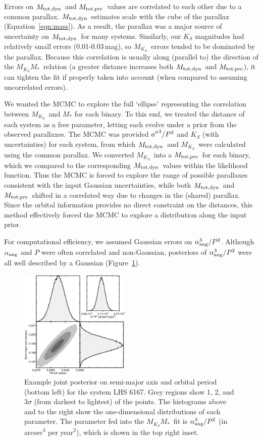 \documentclass[twocolumn]{aastex62}
\newcommand{\mks}{$M_{K_S}$}
\newcommand{\mmk}{$M_{K_S}$\textendash$M_*$}
\newcommand{\mpred}{$M_{\rm{tot,pre}}$}
\newcommand{\mdyn}{$M_{\rm{tot,dyn}}$}
\begin{document}
Errors on \mdyn\ and \mpred\ values are correlated to each other due to a common parallax. \mdyn\ estimates scale with the cube of the parallax (Equation~\ref{eqn:mass}). As a result, the parallax was a major source of uncertainty on \mdyn\ for many systems. Similarly, our $K_S$ magnitudes had relatively small errors (0.01-0.03\,mag), so \mks\ errors tended to be dominated by the parallax. Because this correlation is usually along (parallel to) the direction of the \mmk\ relation (a greater distance increases both \mdyn\ and \mpred), it can tighten the fit if properly taken into account (when compared to assuming uncorrelated errors). 
 
We wanted the MCMC to explore the full `ellipse' representing the correlation between \mks\ and $M_*$ for each binary. To this end, we treated the distance of each system as a free parameter, letting each evolve under a prior from the observed parallaxes. The MCMC was provided $a\mbox{$^{\prime\prime}$}^3/P^2$ and $K_S$ (with uncertainties) for each system, from which \mdyn\ and \mks\ were calculated using the common parallax. We converted \mks\ into a \mpred\ for each binary, which we compared to the corresponding \mdyn\ values within the likelihood function. Thus the MCMC is forced to explore the range of possible parallaxes consistent with the input Gaussian uncertainties, while both \mdyn\ and \mpred\ shifted in a correlated way due to changes in the (shared) parallax. Since the orbital information provides no direct constraint on the distances, this method effectively forced the MCMC to explore a distribution along the input prior. 

For computational efficiency, we assumed Gaussian errors on $\alpha_{\rm{ang}}^3/P^2$. Although $\alpha_{\rm{ang}}$ and $P$ were often correlated and non-Gaussian, posteriors of $\alpha_{\rm{ang}}^3/P^2$ were all well described by a Gaussian (Figure~\ref{fig:correlated}). 

\begin{figure}[htb]
\begin{center}
\includegraphics[width=0.47\textwidth]{LHS6167_corner.eps}
\caption{Example joint posterior on semi-major axis and orbital period (bottom left) for the system LHS 6167. Grey regions show 1, 2, and 3$\sigma$ (from darkest to lightest) of the points. The histograms above and to the right show the one-dimensional distributions of each parameter. The parameter fed into the \mmk\ fit is $\alpha_{\rm{ang}}^3/P^2$ (in arcsec$^3$ per year$^2$), which is shown in the top right inset. }
\label{fig:correlated}
\end{center}
\end{figure}
\end{document}
